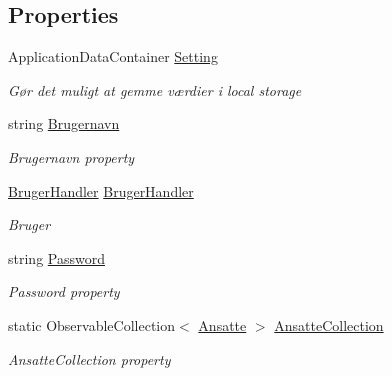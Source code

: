 \subsection*{Properties}
\begin{DoxyCompactItemize}
\item 
Application\+Data\+Container \hyperlink{class__1aarsproeve_1_1_view_model_1_1_bruger_view_model_ac9e91065596a741027a1b88853bd76e6}{Setting}
\begin{DoxyCompactList}\small\item\em Gør det muligt at gemme værdier i local storage \end{DoxyCompactList}\item 
string \hyperlink{class__1aarsproeve_1_1_view_model_1_1_bruger_view_model_a63b4a8aa59a8e3e2ec0d7285c2ce6caa}{Brugernavn}
\begin{DoxyCompactList}\small\item\em Brugernavn property \end{DoxyCompactList}\item 
\hyperlink{class__1aarsproeve_1_1_handler_1_1_bruger_handler}{Bruger\+Handler} \hyperlink{class__1aarsproeve_1_1_view_model_1_1_bruger_view_model_a8243e54970b06a3b95eeaa14c09d9fd8}{Bruger\+Handler}
\begin{DoxyCompactList}\small\item\em Bruger \end{DoxyCompactList}\item 
string \hyperlink{class__1aarsproeve_1_1_view_model_1_1_bruger_view_model_a2efcc56e1c781052fc77fc6aeaed2222}{Password}
\begin{DoxyCompactList}\small\item\em Password property \end{DoxyCompactList}\item 
static Observable\+Collection$<$ \hyperlink{class__1aarsproeve_1_1_model_1_1_ansatte}{Ansatte} $>$ \hyperlink{class__1aarsproeve_1_1_view_model_1_1_bruger_view_model_a29035fd041bc72dd71e131b40e7724e3}{Ansatte\+Collection}
\begin{DoxyCompactList}\small\item\em Ansatte\+Collection property \end{DoxyCompactList}\item 

\end{DoxyCompactItemize}
